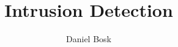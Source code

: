 \documentclass{article}
\begin{document}
\title{%
  Intrusion Detection
}
\author{Daniel Bosk}

\maketitle

\begin{abstract}
  
\end{abstract}



\printbibliography
\end{document}
